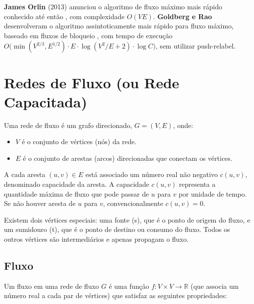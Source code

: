 \documentclass[12pt]{article}
\begin{document}
\textbf{James Orlin} (2013) anunciou o algoritmo de fluxo máximo mais rápido conhecido até então \cite{orlin2013maxflow}, com complexidade $O(VE)$. \textbf{Goldberg e Rao} desenvolveram o algoritmo assintoticamente mais rápido para fluxo máximo, baseado em fluxos de bloqueio \cite{goldberg1998}, com tempo de execução $O\big(\min(V^{2/3}, E^{1/2}) \cdot E \cdot \log(V^2/E + 2) \cdot \log C \big)$, sem utilizar push-relabel.



\newpage
\section{Redes de Fluxo  (ou Rede Capacitada)} 

Uma rede de fluxo é um grafo direcionado, $G = (V, E)$, onde:

\begin{itemize}
    \item $V$ é o conjunto de vértices (nós) da rede.
    \item $E$ é o conjunto de arestas (arcos) direcionadas que conectam os vértices.
\end{itemize}

\noindent A cada aresta $(u, v) \in E$ está associado um número real não negativo $c(u, v)$, denominado capacidade da aresta. A capacidade $c(u, v)$ representa a quantidade máxima de fluxo que pode passar de $u$ para $v$ por unidade de tempo. Se não houver aresta de $u$ para $v$, convencionalmente $c(u, v) = 0$.

\noindent Existem dois vértices especiais: uma fonte (s), que é o ponto de origem do fluxo, e um sumidouro (t), que é o ponto de destino ou consumo do fluxo. Todos os outros vértices são intermediários e apenas propagam o fluxo.

\subsection{Fluxo} 

Um fluxo em uma rede de fluxo $G$ é uma função $f: V \times V \rightarrow \mathbb{R}$ (que associa um número real a cada par de vértices) que satisfaz as seguintes propriedades:
\end{document}
